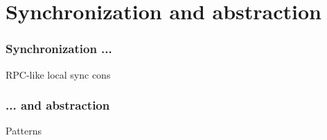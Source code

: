 \section{Synchronization and abstraction}
\begin{frame}
\frametitle{Synchronization ...}
RPC-like
local sync cons
\end{frame}

\begin{frame}
\frametitle{... and abstraction}
Patterns
\end{frame}